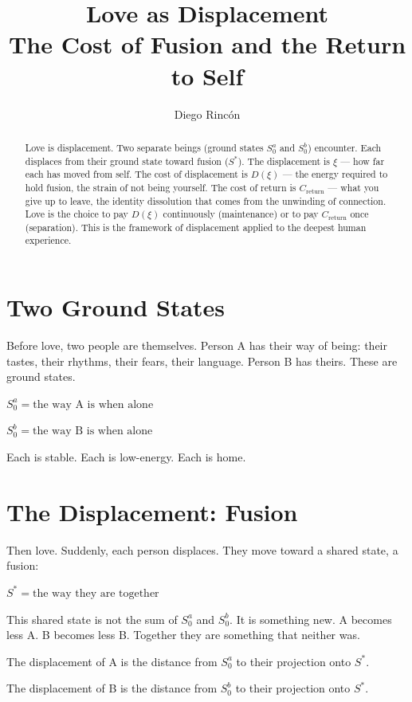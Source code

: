 \documentclass[12pt]{article}
\title{Love as Displacement\\
The Cost of Fusion and the Return to Self}
\author{Diego Rincón}
\date{}
\begin{document}
\maketitle

\begin{abstract}
Love is displacement. Two separate beings (ground states $S_0^a$ and $S_0^b$) encounter. Each displaces from their ground state toward fusion ($S^*$). The displacement is $\xi$ — how far each has moved from self. The cost of displacement is $D(\xi)$ — the energy required to hold fusion, the strain of not being yourself. The cost of return is $C_{\text{return}}$ — what you give up to leave, the identity dissolution that comes from the unwinding of connection. Love is the choice to pay $D(\xi)$ continuously (maintenance) or to pay $C_{\text{return}}$ once (separation). This is the framework of displacement applied to the deepest human experience.
\end{abstract}

\section{Two Ground States}

Before love, two people are themselves. Person A has their way of being: their tastes, their rhythms, their fears, their language. Person B has theirs. These are ground states.

$S_0^a = \text{the way A is when alone}$

$S_0^b = \text{the way B is when alone}$

Each is stable. Each is low-energy. Each is home.

\section{The Displacement: Fusion}

Then love. Suddenly, each person displaces. They move toward a shared state, a fusion:

$S^* = \text{the way they are together}$

This shared state is not the sum of $S_0^a$ and $S_0^b$. It is something new. A becomes less A. B becomes less B. Together they are something that neither was.

The displacement of A is the distance from $S_0^a$ to their projection onto $S^*$.

The displacement of B is the distance from $S_0^b$ to their projection onto $S^*$.
\end{document}
